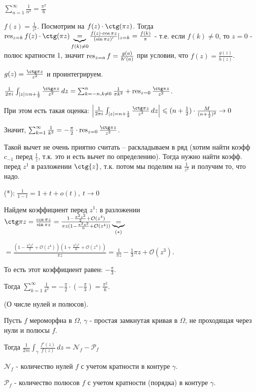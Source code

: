 \begin{example}
    $\sum_{n = 1}^{\infty} \frac{1}{n^2} = \frac{\pi^2}{6}$

    $f(z) = \frac{1}{z^2}$. Посмотрим на $f(z) \cdot \ctg (\pi z)$. Тогда
    $\res_{z = k} f(z) \cdot \ctg (\pi z) \underbrace{=}_{f(k)\neq 0} \frac{f(z)\cdot \cos{\pi z}}{(\sin{\pi z})'}|_{z=k}  = \frac{f(k)}{\pi}$ - т.е. если $f(k) \neq 0$, то $z=0$ - полюс кратности 1, значит $\operatorname{res}_{z=a}f = \frac{g(a)}{h'(a)}$ при условии, что $f(z) = \frac{g(z)}{h(z)}$.

    $g(z) = \frac{\ctg \pi z}{z^2}$ и проинтегрируем.

    $\frac{1}{2 \pi i} \int_{|z| = n + \frac{1}{2}} \frac{\ctg \pi z}{z^2} \, dz =
    \sum_{k = -n, k \neq 0}^n \frac{1}{\pi k^2} + \res_{z = 0} \frac{\ctg \pi z}{z^2}$.

    При этом есть такая оценка:
    $\left | \frac{1}{2 \pi i} \int_{|z| = n + \frac{1}{2}} \frac{\ctg \pi z}{z^2} \, dz \right | \leqslant
    (n + \frac{1}{2}) \cdot \frac{M}{(n + \frac{1}{2})^2} \rightarrow 0$

    Значит, $\sum_{k = 1}^{\infty} \frac{1}{k^2} = -\frac{\pi}{2} \cdot \res_{z = 0} \frac{\ctg \pi z}{z^2}$.

    Такой вычет не очень приятно считать -- раскладываем в ряд (хотим найти коэфф $c_{-1}$ перед $\frac{1}{z}$, т.к. это и есть вычет по определению). Тогда нужно найти коэфф. перед $z^1$ в разложении $\ctg{z}$, т.к. потом мы поделим на $\frac{1}{z^2}$ и получим то, что надо.

    (*): $\frac{1}{1-t} = 1 + t + o(t), \ t \rightarrow 0$

    Найдем коэффициент перед $z^1$: в разложении $\ctg \pi z = \frac{\cos \pi z}{\sin \pi z} = \frac{1 - \frac{\pi^2 z^2}{2} + \mathcal{O}(z^4)}{\pi z (1 - \frac{\pi^2 z^2}{6} + \mathcal{O}(z^4))} \underbrace{=}_{(*)} $


    $ = \frac{(1 - \frac{\pi^2 z^2}{2} + \mathcal{O}(z^4))(1 + \frac{\pi^2 z^2}{6} + \mathcal{O}(z^4))}{\pi z} = \frac{1}{\pi z} - \frac{1}{3} \pi z + \mathcal{O}(z^3)$.

    То есть этот коэффициент равен: $-\frac{\pi}{3}$.

    Тогда $\sum_{k = 1}^{\infty} \frac{1}{k^2} = -\frac{\pi}{2} \cdot (-\frac{\pi}{3}) = \frac{\pi^2}{6}$.
\end{example}

\begin{theorem} (О числе нулей и полюсов).

    Пусть $f$ мероморфна в $\Omega$, $\gamma$ - простая замкнутая кривая в $\Omega$,
    не проходящая через нули и полюсы $f$.

    Тогда $\frac{1}{2 \pi i} \int_{\gamma} \frac{f'(z)}{f(z)} \, dz = \mathcal{N}_f - \mathcal{P}_f$

    $\mathcal{N}_f$ - количество нулей $f$ с учетом кратности в контуре $\gamma$.

    $\mathcal{P}_f$ - количество полюсов $f$ с учетом кратности (порядка) в контуре $\gamma$.
\end{theorem}

